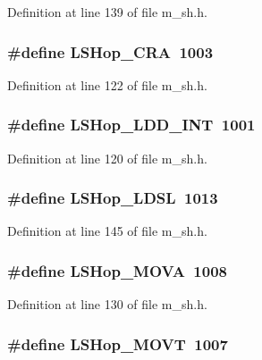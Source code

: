 Definition at line 139 of file m\_\-sh.h.
\subsubsection{\setlength{\rightskip}{0pt plus 5cm}\#define LSHop\_\-CRA~1003}\label{m__sh_8h_4bd6b099237c20c5c5465eda2524913f}




Definition at line 122 of file m\_\-sh.h.
\subsubsection{\setlength{\rightskip}{0pt plus 5cm}\#define LSHop\_\-LDD\_\-INT~1001}\label{m__sh_8h_f696e0290b5076dd6d1cd1b284616bbc}




Definition at line 120 of file m\_\-sh.h.
\subsubsection{\setlength{\rightskip}{0pt plus 5cm}\#define LSHop\_\-LDSL~1013}\label{m__sh_8h_bfa62c1c3f7aafcaed9e1fdbd390a0e7}




Definition at line 145 of file m\_\-sh.h.
\subsubsection{\setlength{\rightskip}{0pt plus 5cm}\#define LSHop\_\-MOVA~1008}\label{m__sh_8h_23d887e551362aad607854f945ee3de2}




Definition at line 130 of file m\_\-sh.h.
\subsubsection{\setlength{\rightskip}{0pt plus 5cm}\#define LSHop\_\-MOVT~1007}\label{m__sh_8h_cea14a0a90ce772c27b822d41b32eb0d}




